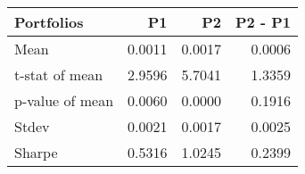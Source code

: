 \begin{tabular}{lrrr}
\toprule
Portfolios & P1 & P2 & P2 - P1 \\
\midrule
Mean & 0.0011 & 0.0017 & 0.0006 \\
t-stat of mean & 2.9596 & 5.7041 & 1.3359 \\
p-value of mean & 0.0060 & 0.0000 & 0.1916 \\
Stdev & 0.0021 & 0.0017 & 0.0025 \\
Sharpe & 0.5316 & 1.0245 & 0.2399 \\
\bottomrule
\end{tabular}
